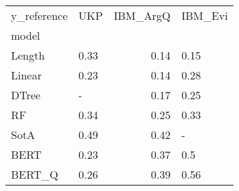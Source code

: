 \begin{tabular}{llrl}
\toprule
y\_reference &   UKP &  IBM\_ArgQ & IBM\_Evi \\
model  &       &           &         \\
\midrule
Length &  0.33 &      0.14 &    0.15 \\
Linear &  0.23 &      0.14 &    0.28 \\
DTree  &     - &      0.17 &    0.25 \\
RF     &  0.34 &      0.25 &    0.33 \\
SotA   &  0.49 &      0.42 &       - \\
BERT   &  0.23 &      0.37 &     0.5 \\
BERT\_Q &  0.26 &      0.39 &    0.56 \\
\bottomrule
\end{tabular}
